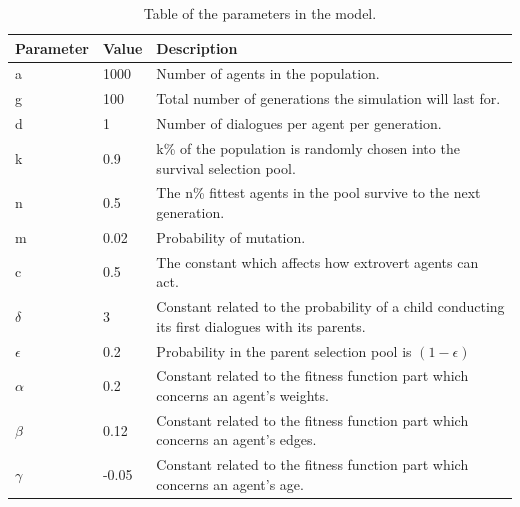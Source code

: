 \begin{table}[htbp]
    \centering
    \caption[Table of the parameters in the model.]{Table of the parameters in the model.}\label{tab:params}
    \begin{tabu} to 1.0\textwidth { X[1,c] X[1,c] X[5,p] }%
         \hline
         \rowfont\bfseries
         Parameter & Value & Description \\ 
         \hline
         a & 1000 & Number of agents in the population. \\ 
         g & 100 & Total number of generations the simulation will last for. \\

         d & 1 & Number of dialogues per agent per generation. \\

         k & 0.9 & k\% of the population is randomly chosen into the survival selection pool. \\

         n & 0.5 & The n\% fittest agents in the pool survive to the next generation. \\ 

         m & 0.02 & Probability of mutation. \\

         c & 0.5 & The constant which affects how extrovert agents can act. \\
         $\delta$ & 3 & Constant related to the probability of a child conducting its first dialogues with its parents.\\
         
          $\epsilon$ & 0.2 & Probability in the parent selection pool is $(1-\epsilon)$\\ 

          $\alpha$ & 0.2 & Constant related to the fitness function part which concerns an agent's weights.\\

          $\beta$ & 0.12 & Constant related to the fitness function part which concerns an agent's edges. \\

         $\gamma$ & -0.05 & Constant related to the fitness function part which concerns an agent's age. \\ 
         \hline
    \end{tabu}
\end{table}

